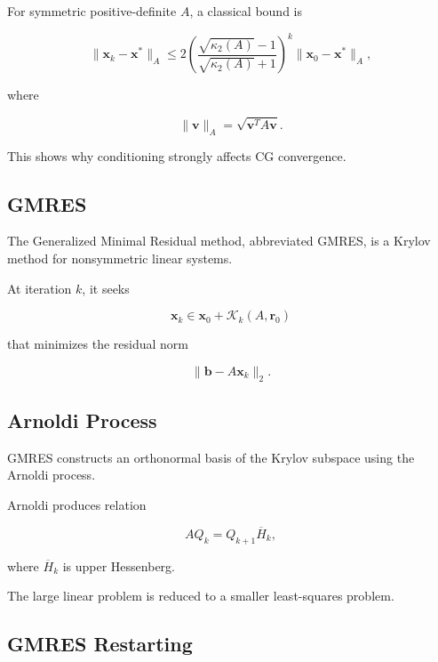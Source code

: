 For symmetric positive-definite \(A\), a classical bound is

\[
\boxed{
\|\mathbf{x}_k-\mathbf{x}^*\|_A
\leq
2
\left(
\frac{
\sqrt{\kappa_2(A)}-1
}{
\sqrt{\kappa_2(A)}+1
}
\right)^k
\|\mathbf{x}_0-\mathbf{x}^*\|_A,
}
\]

where

\[
\boxed{
\|\mathbf{v}\|_A
=
\sqrt{
\mathbf{v}^TA\mathbf{v}
}.
}
\]

This shows why conditioning strongly affects CG convergence.

\subsection{GMRES}
\label{subsec:gmres}

The Generalized Minimal Residual method, abbreviated GMRES, is a Krylov
method for nonsymmetric linear systems.

At iteration \(k\), it seeks

\[
\boxed{
\mathbf{x}_k
\in
\mathbf{x}_0
+
\mathcal{K}_k
(
A,\mathbf{r}_0
)
}
\]

that minimizes the residual norm

\[
\boxed{
\|\mathbf{b}-A\mathbf{x}_k\|_2.
}
\]

\subsection{Arnoldi Process}
\label{subsec:arnoldi-process}

GMRES constructs an orthonormal basis of the Krylov subspace using the
Arnoldi process.

Arnoldi produces relation

\[
\boxed{
AQ_k
=
Q_{k+1}
\overline{H}_k,
}
\]

where \(\overline{H}_k\) is upper Hessenberg.

The large linear problem is reduced to a smaller least-squares problem.

\subsection{GMRES Restarting}
\label{subsec:gmres-restarting}

